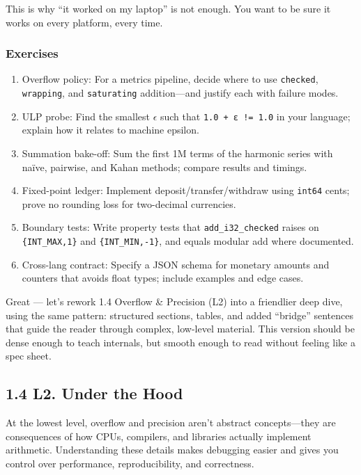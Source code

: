 \documentclass[
  letterpaper,
  DIV=11,
  numbers=noendperiod]{scrreprt}
\providecommand{\tightlist}{%
  \setlength{\itemsep}{0pt}\setlength{\parskip}{0pt}}
\begin{document}
This is why ``it worked on my laptop'' is not enough. You want to be
sure it works on every platform, every time.

\subsubsection{Exercises}\label{exercises-10}

\begin{enumerate}
\def\labelenumi{\arabic{enumi}.}
\tightlist
\item
  Overflow policy: For a metrics pipeline, decide where to use
  \texttt{checked}, \texttt{wrapping}, and \texttt{saturating}
  addition---and justify each with failure modes.
\item
  ULP probe: Find the smallest \(\epsilon\) such that
  \texttt{1.0\ +\ ε\ !=\ 1.0} in your language; explain how it relates
  to machine epsilon.
\item
  Summation bake-off: Sum the first 1M terms of the harmonic series with
  naïve, pairwise, and Kahan methods; compare results and timings.
\item
  Fixed-point ledger: Implement deposit/transfer/withdraw using
  \texttt{int64} cents; prove no rounding loss for two-decimal
  currencies.
\item
  Boundary tests: Write property tests that \texttt{add\_i32\_checked}
  raises on \texttt{\{INT\_MAX,1\}} and \texttt{\{INT\_MIN,-1\}}, and
  equals modular add where documented.
\item
  Cross-lang contract: Specify a JSON schema for monetary amounts and
  counters that avoids float types; include examples and edge cases.
\end{enumerate}

Great --- let's rework 1.4 Overflow \& Precision (L2) into a friendlier
deep dive, using the same pattern: structured sections, tables, and
added ``bridge'' sentences that guide the reader through complex,
low-level material. This version should be dense enough to teach
internals, but smooth enough to read without feeling like a spec sheet.

\subsection{1.4 L2. Under the Hood}\label{l2.-under-the-hood}

At the lowest level, overflow and precision aren't abstract
concepts---they are consequences of how CPUs, compilers, and libraries
actually implement arithmetic. Understanding these details makes
debugging easier and gives you control over performance,
reproducibility, and correctness.
\end{document}
